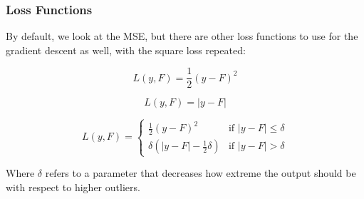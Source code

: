 \subsubsection{Loss Functions}

By default, we look at the MSE, but there are other loss functions to use for
the gradient descent as well, with the square loss repeated:

\begin{definition}
  \begin{displaymath}
    L(y, F) = \frac{1}{2} (y - F)^2
  \end{displaymath}
\end{definition}

\begin{definition}
  \begin{displaymath}
    L(y, F) = \left| y - F \right|
  \end{displaymath}
\end{definition}

\begin{definition}
  \begin{displaymath} L(y, F) =
    \begin{cases}
      \frac{1}{2} (y - F)^2 & \text{if } |y - F| \leq
      \delta \\
      \delta \left( |y - F| - \frac{1}{2} \delta \right) &
      \text{if } |y - F| > \delta
    \end{cases}
  \end{displaymath}

  Where $\delta$ refers to a parameter that decreases how
  extreme the output should be with respect to higher
  outliers.
\end{definition}

